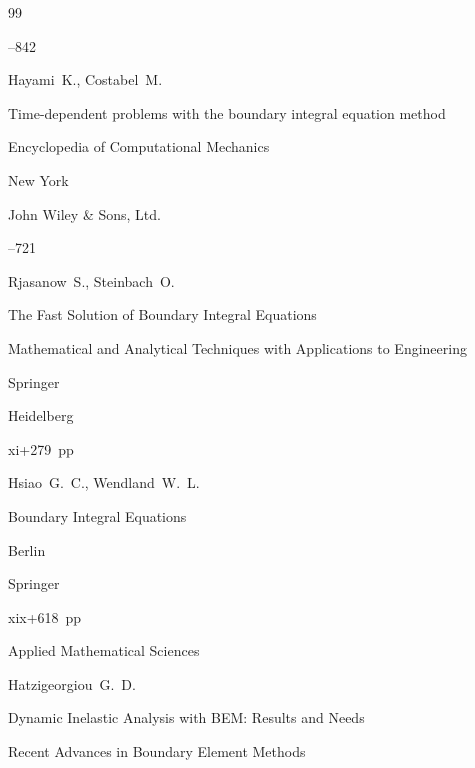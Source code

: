\begin{thebibliography}{99}

--842





\by Hayami~K., Costabel~M.

\paper Time-dependent problems with the boundary integral equation method

\inbook Encyclopedia of Computational Mechanics

\publaddr New York

\publ John Wiley {\&} Sons, Ltd.


--721





\by Rjasanow~S., Steinbach~O.

\book  The Fast Solution of Boundary Integral Equations

\serial Mathematical and Analytical Techniques with Applications to Engineering

\publ  Springer

\publaddr Heidelberg


\totalpages xi+279~pp \nofrills





\by Hsiao~G.~C., Wendland~W.~L.

\book Boundary Integral Equations

\publaddr Berlin

\publ Springer


\totalpages xix+618~pp \nofrills


\serial  Applied Mathematical Sciences





\by Hatzigeorgiou~G.~D.

\paper  Dynamic Inelastic Analysis with BEM: Results and Needs 

\inbook Recent Advances in Boundary Element Methods


\end{thebibliography}

